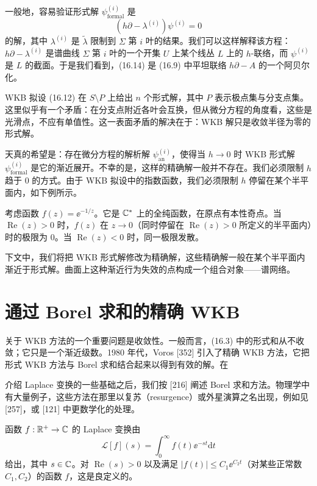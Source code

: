 一般地，容易验证形式解 $\psi^{(i)}_{\mathrm{formal}}$ 是
\begin{equation}
(h\partial-\lambda^{(i)})\psi^{(i)}=0
\tag{16.14}
\end{equation}
的解，其中 $\lambda^{(i)}$ 是 $\tilde\lambda$ 限制到 $\Sigma$ 第 $i$ 叶的结果。我们可以这样解释该方程：$h\partial-\lambda^{(i)}$ 是谱曲线 $\Sigma$ 第 $i$ 叶的一个开集 $U$ 上某个线丛 $L$ 上的 $h$-联络，而 $\psi^{(i)}$ 是 $L$ 的截面。于是我们看到，(16.14) 是 (16.9) 中平坦联络 $h\partial-A$ 的一个阿贝尔化。

WKB 拟设 (16.12) 在 $S\setminus P$ 上给出 $n$ 个形式解，其中 $P$ 表示极点集与分支点集。这里似乎有一个矛盾：在分支点附近各叶会互换，但从微分方程的角度看，这些是光滑点，不应有单值性。这一表面矛盾的解决在于：WKB 解只是收敛半径为零的形式解。

天真的希望是：存在微分方程的解析解 $\psi^{(i)}_{\mathrm{an}}$，使得当 $h\to0$ 时 WKB 形式解 $\psi^{(i)}_{\mathrm{formal}}$ 是它的渐近展开。不幸的是，这样的精确解一般并不存在。我们必须限制 $h$ 趋于 0 的方式。由于 WKB 拟设中的指数函数，我们必须限制 $h$ 停留在某个半平面内，如下例所示。

\begin{example}[16.5] 考虑函数 $f(z)=\ee^{-1/z}$。它是 $\mathbb{C}^*$ 上的全纯函数，在原点有本性奇点。当 $\operatorname{Re}(z)>0$ 时，$f(z)$ 在 $z\to0$（同时停留在 $\operatorname{Re}(z)>0$ 所定义的半平面内）时的极限为 0。当 $\operatorname{Re}(z)<0$ 时，同一极限发散。\end{example}

下文中，我们将把 WKB 形式解修改为精确解，这些精确解一般在某个半平面内渐近于形式解。曲面上这种渐近行为失效的点构成一个组合对象——谱网络。

\section{通过 Borel 求和的精确 WKB}

关于 WKB 方法的一个重要问题是收敛性。一般而言，(16.3) 中的形式和从不收敛；它只是一个渐近级数。1980 年代，Voros [352] 引入了精确 WKB 方法，它把形式 WKB 方法与 Borel 求和结合起来以得到有效的解。在

介绍 Laplace 变换的一些基础之后，我们按 [216] 阐述 Borel 求和方法。物理学中有大量例子，这些方法在那里以复苏（resurgence）或外星演算之名出现，例如见 [257]，或 [121] 中更数学化的处理。

函数 $f:\mathbb{R}^+\to\mathbb{C}$ 的 Laplace 变换由
\begin{equation}
\mathcal{L}[f](s)=\int_0^\infty f(t)\ee^{-st}\mathrm{d}t
\tag{16.15}
\end{equation}
给出，其中 $s\in\mathbb{C}$。对 $\operatorname{Re}(s)>0$ 以及满足 $|f(t)|\le C_1\ee^{C_2t}$（对某些正常数 $C_1,C_2$）的函数 $f$，这是良定义的。

